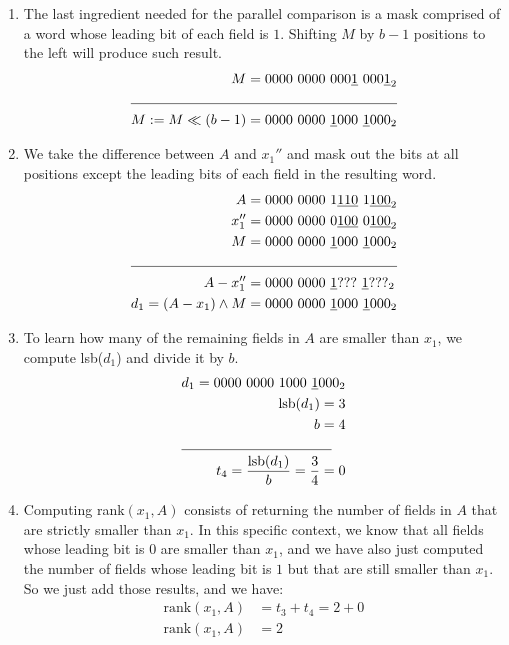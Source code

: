\begin{itemize}
\begin{enumerate}
        \item
        The last ingredient needed for the parallel comparison is a mask comprised of a word whose leading bit of each field is $1$. Shifting $M$ by $b - 1$ positions to the left will produce such result.
        \begin{align*}
            M = 0000\ 0000\ 000\underline{1}\ 000\underline{1}_2& \\
            \cline{1-2}
            M := M \ll (b - 1) = 0000\ 0000\ \underline{1}000\ \underline{1}000_2& \\
        \end{align*}
        
        \item
        We take the difference between $A$ and $x_1''$ and mask out the bits at all positions except the leading bits of each field in the resulting word.
        \begin{align*}
            A &= 0000\ 0000\ 1\underline{110}\ 1\underline{100}_2 \\
            x_1'' &= 0000\ 0000\ 0\underline{100}\ 0\underline{100}_2 \\
            M &= 0000\ 0000\ \underline{1}000\ \underline{1}000_2 \\
            \cline{1-2}
            A - x_1'' &= 0000\ 0000\ \underline{1}???\ \underline{1}???_2 \\
            d_1 = (A - x_1) \wedge M &= 0000\ 0000\ \underline{1}000\ \underline{1}000_2 \\
        \end{align*}
        
        \item
        To learn how many of the remaining fields in $A$ are smaller than $x_1$, we compute lsb($d_1$) and divide it by $b$.
        \begin{align*}
            d_1 = 0000\ 0000\ 1000\ \underline{1}000_2 \\
            \text{lsb}(d_1) = 3 \\
            b = 4 \\
            \cline{1-2}
            t_4 = \frac{\text{lsb}(d_1)}{b} = \frac{3}{4} = 0 
        \end{align*}
        
        \item
        Computing rank$(x_1, A)$ consists of returning the number of fields in $A$ that are strictly smaller than $x_1$. In this specific context, we know that all fields whose leading bit is $0$ are smaller than $x_1$, and we have also just computed the number of fields whose leading bit is $1$ but that are still smaller than $x_1$. So we just add those results, and we have:
        \begin{align*}
            \text{rank}(x_1, A) &= t_3 + t_4 = 2 + 0 \\
            \text{rank}(x_1, A) &= 2
        \end{align*}
        

\end{enumerate}
\end{itemize}
